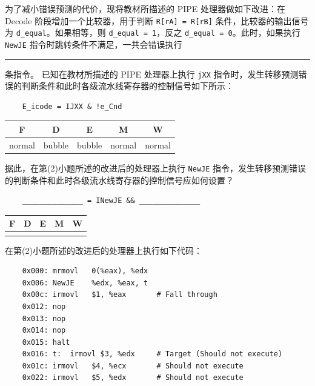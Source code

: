 \begin{problems}
        为了减小错误预测的代价，现将教材所描述的 PIPE 处理器做如下改进：在 Decode 阶段增加一个比较器，用于判断 \verb|R[rA] = R[rB]| 条件，比较器的输出信号为 \verb|d_equal|。如果相等，则 \verb|d_equal = 1|，反之 \verb|d_equal = 0|。此时，如果执行 \verb|NewJE| 指令时跳转条件不满足，一共会错误执行 \rule{2.5cm}{0.25mm} 条指令。
        \qn 已知在教材所描述的 PIPE 处理器上执行 \verb|jXX| 指令时，发生转移预测错误的判断条件和此时各级流水线寄存器的控制信号如下所示：
        \begin{verbatim}
    E_icode = IJXX & !e_Cnd
        \end{verbatim}
        \begin{table}[H]
            \centering
            \begin{tabular}{|c|c|c|c|c|}
                \hline
                F & D & E & M & W \\ \hline
                normal & bubble & bubble & normal & normal \\ \hline
            \end{tabular}
        \end{table}
        据此，在第(2)小题所述的改进后的处理器上执行 \verb|NewJE| 指令，发生转移预测错误的判断条件和此时各级流水线寄存器的控制信号应如何设置？
        \begin{verbatim}
    ______________ = INewJE && ______________
        \end{verbatim}
        \begin{table}[H]
            \centering
            \begin{tabular}{|c|c|c|c|c|}
                \hline
                F & D & E & M & W \\ \hline
                {\qquad \qquad} & {\qquad \qquad} & {\qquad \qquad} & {\qquad \qquad} & {\qquad \qquad} \\ \hline
            \end{tabular}
        \end{table}
        \qn 在第(2)小题所述的改进后的处理器上执行如下代码：
        \begin{verbatim}
    0x000: mrmovl   0(%eax), %edx
    0x006: NewJE    %edx, %eax, t
    0x00c: irmovl   $1, %eax       # Fall through
    0x012: nop
    0x013: nop
    0x014: nop
    0x015: halt
    0x016: t:  irmovl $3, %edx     # Target (Should not execute)
    0x01c: irmovl   $4, %ecx       # Should not execute
    0x022: irmovl   $5, %edx       # Should not execute
        \end{verbatim}

\end{problems}

